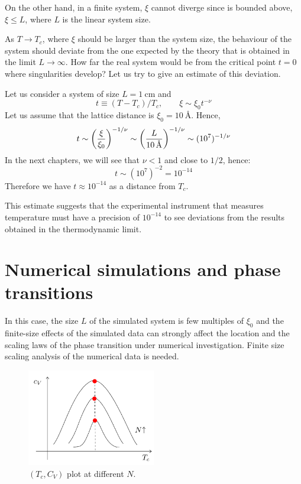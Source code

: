 \documentclass[../main/main.tex]{subfiles}
\begin{document}
On the other hand, in a finite system, \( \xi  \) cannot diverge since is bounded above, \( \xi \le L \), where \( L \) is the linear system size.

As \( T \rightarrow T_c \), where \( \xi  \) should be larger than the system size, the behaviour of the system should deviate from the one expected by the theory that is obtained in the limit \( L \rightarrow \infty  \). How far the real system would be from the critical point \( t=0 \) where singularities develop? Let us try to give an estimate of this deviation.

 Let us consider a system of size \( L = \SI{1}{\cm}  \) and
\begin{equation*}
  t \equiv (T-T_c)/T_c, \qquad \xi \sim \xi _0 t^{-\nu }
\end{equation*}
Let us assume that the lattice distance is \( \xi _0 = \SI{10}{\angstrom}  \). Hence,
 \begin{equation}
   t \sim \qty(\frac{\xi }{\xi _0})^{-1/\nu } \sim \qty(\frac{L}{\SI{10}{\angstrom} })^{-1/\nu } \sim (10^{7})^{-1/\nu }
 \end{equation}
In the next chapters, we will see that \( \nu < 1 \) and close to \( 1/2 \), hence:
\begin{equation*}
  t \sim (10^{7})^{-2 } = 10^{-14}
\end{equation*}
Therefore we have \( t \approx 10^{-14} \)  as a distance from \( T_c \).

This estimate suggests that the experimental instrument that measures temperature must have a precision of \( 10^{-14} \)  to see deviations from the results obtained in the thermodynamic limit.


\clearpage

\section{Numerical simulations and phase transitions}

In this case, the size \( L \) of the simulated system is few multiples of \( \xi _0 \) and the finite-size effects of the simulated data can strongly affect the location and the scaling laws of the phase transition under numerical investigation.
Finite size scaling analysis of the numerical data is needed.

\begin{figure}[h!]
\centering
\includegraphics[width=0.5\textwidth]{../lessons/5_image/2.pdf}
\caption{\label{fig:5_2} \( (T_c,C_V) \) plot at different \( N \).}
\end{figure}
\end{document}
